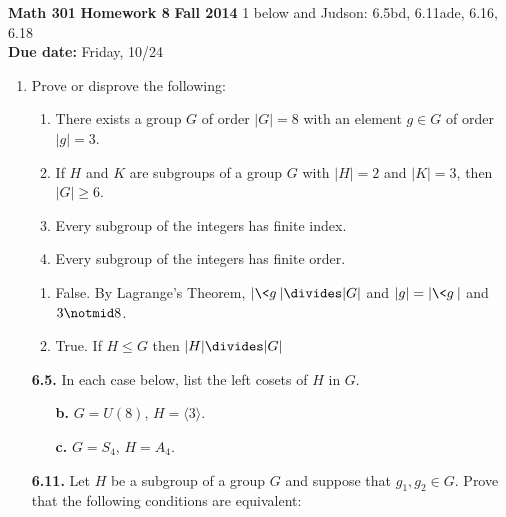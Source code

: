 \documentclass[12pt,reqno]{amsart}
\newcommand{\probskip}{\vskip1cm}
\begin{document}
\thispagestyle{empty}

\noindent \textbf{Math 301} \hskip5cm {\bf Homework 8} \hfill {\bf Fall 2014}
\vskip1cm
 1 below and Judson: 6.5bd, 6.11ade, 6.16, 6.18\\
{\bf Due date:} Friday, 10/24

\bigskip

\begin{enumerate}[{\bf 1.}]

\item
Prove or disprove the following: 
\begin{enumerate}
\item 
There exists a group $G$ of order $|G| = 8$ with an element
$g \in G$ of order $|g|=3$.

\item
If $H$ and $K$ are subgroups of a group $G$ with $|H|=2$ and $|K|=3$, 
  then $|G|\geq 6$.

\item
Every subgroup of the integers has finite index.

\item 
Every subgroup of the integers has finite order.
\end{enumerate}

\begin{enumerate}
\item False.  By Lagrange's Theorem, $|\<g\>| \divides |G|$ and $|g| = |\<g\>|$
  and $3 \notmid 8$.
\item True.  If $H\leq G$ then $|H| \divides |G|$
\end{enumerate}
\probskip

\item[{\bf 6.5.}]
In each case below, list the left cosets of $H$ in $G$.
\begin{enumerate}
\item[{\bf b.}]
$G = U(8)$, $H = \langle 3 \rangle$.
\item[{\bf c.}]
$G = S_4$, $H = A_4$.
\end{enumerate}

\probskip

\item[{\bf 6.11.}] 
Let $H$ be a subgroup of a group $G$ and suppose that $g_1, g_2 \in G$.  Prove
that the following conditions are equivalent: 
\begin{enumerate}
 

\end{enumerate}
\end{enumerate}
\end{document}

